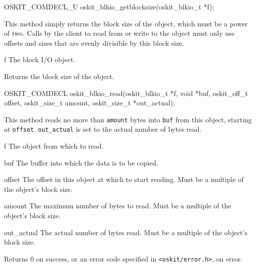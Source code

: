 \begin{apisyn}

	\funcproto OSKIT_COMDECL_U
	oskit_blkio_getblocksize(oskit_blkio_t *f);
\end{apisyn}
\begin{apidesc}
	This method simply returns the block size of the object,
	which must be a power of two.
	Calls by the client to read from or write to the object
	must only use offsets and sizes
	that are evenly divisible by this block size.
\end{apidesc}
\begin{apiparm}
	\item[f]
		The block I/O object.
\end{apiparm}
\begin{apiret}
	Returns the block size of the object.
\end{apiret}


\begin{apisyn}

	\funcproto OSKIT_COMDECL
	oskit_blkio_read(oskit_blkio_t *f, 
		         void *buf,
	                 oskit_off_t offset,
			 oskit_size_t amount,
			 \outparam oskit_size_t *out_actual);
\end{apisyn}
\begin{apidesc}
	This method reads no more than {\tt amount} bytes into
	{\tt buf} from this object, starting at {\tt offset}.
	{\tt out_actual} is set to the actual number of bytes read.
\end{apidesc}
\begin{apiparm}
	\item[f]
		The object from which to read.
	\item[buf]
		The buffer into which the data is to be copied.	
	\item[offset]
		The offset in this object at which to start reading.
		Must be a multiple of the object's block size.
	\item[amount]
		The maximum number of bytes to read.	
		Must be a multiple of the object's block size.
	\item[out_actual]
		The actual number of bytes read.
		Must be a multiple of the object's block size.
\end{apiparm}
\begin{apiret}
	Returns 0 on success, or an error code specified in
	{\tt <oskit/error.h>}, on error.
\end{apiret}


